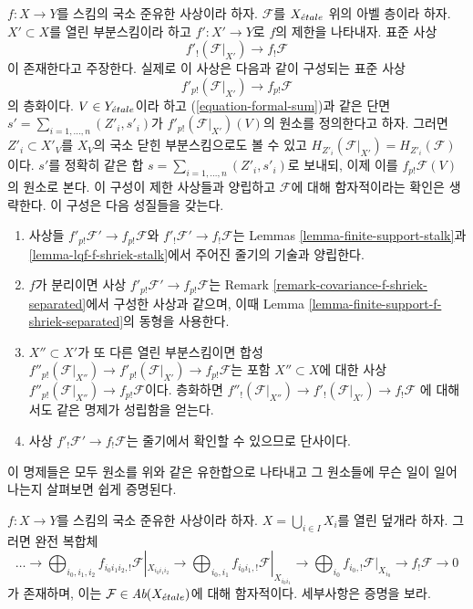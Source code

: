 \begin{remark}
\label{remark-covariance-lqf-f-shriek}
$f : X \to Y$를 스킴의 국소 준유한 사상이라 하자.
$\mathcal{F}$를 $X_{\acute{e}tale}$ 위의 아벨 층이라 하자.
$X' \subset X$를 열린 부분스킴이라 하고 $f' : X' \to Y$로
$f$의 제한을 나타내자. 표준 사상
$$
f'_!(\mathcal{F}|_{X'}) \longrightarrow f_!\mathcal{F}
$$
이 존재한다고 주장한다. 실제로 이 사상은 다음과 같이 구성되는
표준 사상
$$
f'_{p!}(\mathcal{F}|_{X'}) \to f_{p!}\mathcal{F}
$$
의 층화이다. $V \in Y_{\acute{e}tale}$이라 하고
(\ref{equation-formal-sum})과 같은 단면
$s' = \sum_{i = 1, \ldots, n} (Z'_i, s'_i)$가
$f'_{p!}(\mathcal{F}|_{X'})(V)$의 원소를 정의한다고 하자.
그러면 $Z'_i \subset X'_V$를 $X_V$의 국소 닫힌 부분스킴으로도
볼 수 있고 $H_{Z'_i}(\mathcal{F}|_{X'}) = H_{Z'_i}(\mathcal{F})$이다.
$s'$를 정확히 같은 합
$s = \sum_{i = 1, \ldots, n} (Z'_i, s'_i)$로 보내되, 이제 이를
$f_{p!}\mathcal{F}(V)$의 원소로 본다. 이 구성이 제한 사상들과
양립하고 $\mathcal{F}$에 대해 함자적이라는 확인은 생략한다.
이 구성은 다음 성질들을 갖는다.
\begin{enumerate}
\item 사상들 $f'_{p!}\mathcal{F}' \to f_{p!}\mathcal{F}$와
$f'_!\mathcal{F}' \to f_!\mathcal{F}$는 Lemmas
\ref{lemma-finite-support-stalk}과 \ref{lemma-lqf-f-shriek-stalk}에서
주어진 줄기의 기술과 양립한다.
\item $f$가 분리이면 사상
$f'_{p!}\mathcal{F}' \to f_{p!}\mathcal{F}$는 Remark
\ref{remark-covariance-f-shriek-separated}에서 구성한 사상과 같으며,
이때 Lemma \ref{lemma-finite-support-f-shriek-separated}의 동형을
사용한다.
\item $X'' \subset X'$가 또 다른 열린 부분스킴이면 합성
$f''_{p!}(\mathcal{F}|_{X''}) \to f'_{p!}(\mathcal{F}|_{X'}) \to
f_{p!}\mathcal{F}$는 포함 $X'' \subset X$에 대한 사상
$f''_{p!}(\mathcal{F}|_{X''}) \to f_{p!}\mathcal{F}$이다. 층화하면
$f''_!(\mathcal{F}|_{X''}) \to f'_!(\mathcal{F}|_{X'}) \to f_!\mathcal{F}$
에 대해서도 같은 명제가 성립함을 얻는다.
\item 사상 $f'_!\mathcal{F}' \to f_!\mathcal{F}$는 줄기에서 확인할
수 있으므로 단사이다.
\end{enumerate}
이 명제들은 모두 원소를 위와 같은 유한합으로 나타내고 그 원소들에
무슨 일이 일어나는지 살펴보면 쉽게 증명된다.
\end{remark}

\begin{lemma}
\label{lemma-lqf-colimit-f-shriek}
$f : X \to Y$를 스킴의 국소 준유한 사상이라 하자.
$X = \bigcup_{i \in I} X_i$를 열린 덮개라 하자. 그러면 완전 복합체
$$
\ldots \to
\bigoplus\nolimits_{i_0, i_1, i_2} f_{i_0i_1i_2, !}
\mathcal{F}|_{X_{i_0i_1i_2}} \to
\bigoplus\nolimits_{i_0, i_1} f_{i_0i_1, !} \mathcal{F}|_{X_{i_0i_1}} \to
\bigoplus\nolimits_{i_0} f_{i_0, !} \mathcal{F}|_{X_{i_0}}
\to f_!\mathcal{F} \to 0
$$
가 존재하며, 이는 $\mathcal{F} \in \textit{Ab}(X_{\acute{e}tale})$에 대해
함자적이다. 세부사항은 증명을 보라.
\end{lemma}

